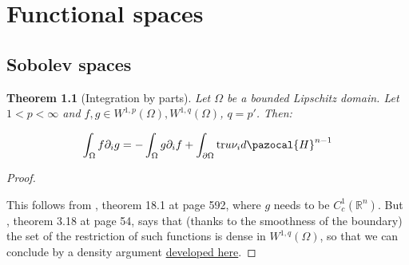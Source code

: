 \documentclass[english,a4paper,10pt,oneside]{scrbook}	%
\theoremstyle{break}
\newtheorem{thm}[equation]{Theorem}
\newenvironment{mproof}[1][\proofname]{%
  \begin{proof}[#1]$ $\par\nobreak\ignorespaces
}{%
  \end{proof}
}
\renewcommand*{\proofname}{Proof}
\theoremstyle{remark}
\newcommand{\mR}{\mathbb{R}}
\newcommand{\tr}{\text{tr}}
\begin{document}
\appendix

\chapter{Functional spaces}
\section{Sobolev spaces}

\begin{thm}[Integration by parts]
\label{thm:ibp}
Let $\Omega$ be a bounded Lipschitz domain. Let $1<p<\infty$ and $f,g \in W^{1,p}(\Omega), W^{1,q}(\Omega)$, $q=p'$. Then:

$$\int_\Omega f \partial_i g = -\int_\Omega g \partial_i f+\int_{\partial \Omega} \tr u \nu_i d\pazocal{H}^{n-1}$$
\end{thm}
\begin{mproof}

This follows from \cite{leoni}, theorem 18.1 at page 592, where $g$ needs to be $C^1_c(\mR^n)$. But \cite{adams}, theorem 3.18 at page 54, says that (thanks to the smoothness of the boundary) the set of the restriction of such functions is dense in $W^{1,q}(\Omega)$, so that we can conclude by a density argument \textcolor{red}{\href{https://www.math.kit.edu/iana2/lehre/sobolevspaces2021s/media/lec15.pdf}{developed here}}.

\end{mproof}
\end{document}
